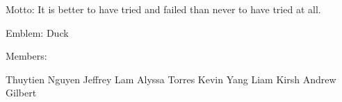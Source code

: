 \documentclass[12 pt]{article}
\author{Cal Poly Hackers}
\begin{document}
\maketitle
Motto: It is better to have tried and failed than never to have tried at all.

Emblem: Duck

Members:

Thuytien Nguyen
Jeffrey Lam 
Alyssa Torres
Kevin Yang
Liam Kirsh
Andrew Gilbert
\end{document}
